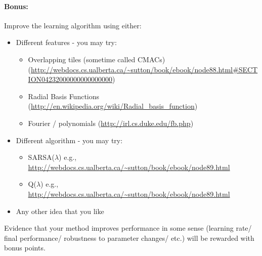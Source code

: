 \begin{exercise}
\paragraph{Bonus:} Improve the learning algorithm using either:
\begin{itemize}
  \item Different features - you may try:
  \begin{itemize}
    \item Overlapping tiles (sometime called CMACs) (\url{http://webdocs.cs.ualberta.ca/~sutton/book/ebook/node88.html#SECTION04232000000000000000})
    \item Radial Basis Functions (\url{http://en.wikipedia.org/wiki/Radial_basis_function})
    \item Fourier / polynomials (\url{http://irl.cs.duke.edu/fb.php})
  \end{itemize}
  \item Different algorithm - you may try:
  \begin{itemize}
    \item SARSA($\lambda $) e.g., \url{http://webdocs.cs.ualberta.ca/~sutton/book/ebook/node89.html}
    \item Q($\lambda $) e.g., \url{http://webdocs.cs.ualberta.ca/~sutton/book/ebook/node89.html}
  \end{itemize}
  \item Any other idea that you like
\end{itemize}
Evidence that your method improves performance in some sense (learning rate/ final performance/ robustness to parameter changes/ etc.) will be rewarded with bonus points.
\end{exercise} 